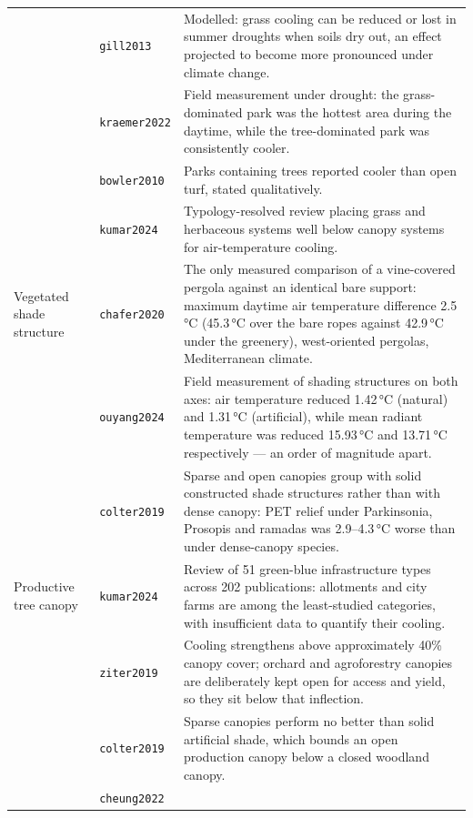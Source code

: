 \begin{longtable}{@{}>{\raggedright\arraybackslash}p{30mm} l
                    >{\raggedright\arraybackslash}p{72mm}@{}}
 & \texttt{gill2013} &
Modelled: grass cooling can be reduced or lost in summer droughts when soils dry out, an effect projected to become more pronounced under climate change. \\
 & \texttt{kraemer2022} &
Field measurement under drought: the grass-dominated park was the hottest area during the daytime, while the tree-dominated park was consistently cooler. \\
 & \texttt{bowler2010} &
Parks containing trees reported cooler than open turf, stated qualitatively. \\
 & \texttt{kumar2024} &
Typology-resolved review placing grass and herbaceous systems well below canopy systems for air-temperature cooling. \\
\addlinespace
Vegetated shade structure & \texttt{chafer2020} &
The only measured comparison of a vine-covered pergola against an identical bare support: maximum daytime air temperature difference 2.5\,\si{\degreeCelsius} (45.3\,\si{\degreeCelsius} over the bare ropes against 42.9\,\si{\degreeCelsius} under the greenery), west-oriented pergolas, Mediterranean climate. \\
 & \texttt{ouyang2024} &
Field measurement of shading structures on both axes: air temperature reduced 1.42\,\si{\degreeCelsius} (natural) and 1.31\,\si{\degreeCelsius} (artificial), while mean radiant temperature was reduced 15.93\,\si{\degreeCelsius} and 13.71\,\si{\degreeCelsius} respectively --- an order of magnitude apart. \\
 & \texttt{colter2019} &
Sparse and open canopies group with solid constructed shade structures rather than with dense canopy: PET relief under Parkinsonia, Prosopis and ramadas was 2.9--4.3\,\si{\degreeCelsius} worse than under dense-canopy species. \\
\addlinespace
Productive tree canopy & \texttt{kumar2024} &
Review of 51 green-blue infrastructure types across 202 publications: allotments and city farms are among the least-studied categories, with insufficient data to quantify their cooling. \\
 & \texttt{ziter2019} &
Cooling strengthens above approximately 40\% canopy cover; orchard and agroforestry canopies are deliberately kept open for access and yield, so they sit below that inflection. \\
 & \texttt{colter2019} &
Sparse canopies perform no better than solid artificial shade, which bounds an open production canopy below a closed woodland canopy. \\
 & \texttt{cheung2022} &

\end{longtable}
